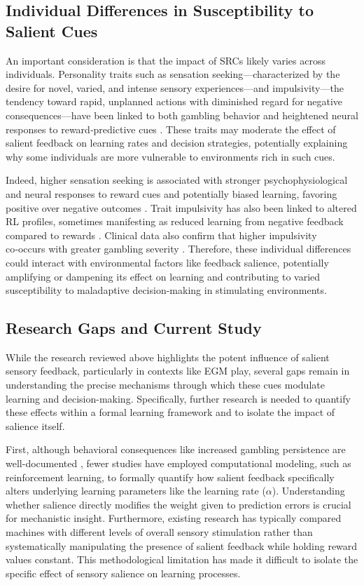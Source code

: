 \subsection{Individual Differences in Susceptibility to Salient Cues}

An important consideration is that the impact of SRCs likely varies across individuals. Personality traits such as sensation seeking—characterized by the desire for novel, varied, and intense sensory experiences—and impulsivity—the tendency toward rapid, unplanned actions with diminished regard for negative consequences—have been linked to both gambling behavior and heightened neural responses to reward‑predictive cues \citep{hawes2017, verdejo2008, zuckerman1994}. These traits may moderate the effect of salient feedback on learning rates and decision strategies, potentially explaining why some individuals are more vulnerable to environments rich in such cues.

Indeed, higher sensation seeking is associated with stronger psychophysiological and neural responses to reward cues \citep{hawes2017} and potentially biased learning, favoring positive over negative outcomes \citep{xu2019}. Trait impulsivity has also been linked to altered RL profiles, sometimes manifesting as reduced learning from negative feedback compared to rewards \citep{pauli2025, zou2022}. Clinical data also confirm that higher impulsivity co‑occurs with greater gambling severity \citep{blaszczynski1997, slutske2005}. Therefore, these individual differences could interact with environmental factors like feedback salience, potentially amplifying or dampening its effect on learning and contributing to varied susceptibility to maladaptive decision-making in stimulating environments.

\subsection{Research Gaps and Current Study}

While the research reviewed above highlights the potent influence of salient sensory feedback, particularly in contexts like EGM play, several gaps remain in understanding the precise mechanisms through which these cues modulate learning and decision-making. Specifically, further research is needed to quantify these effects within a formal learning framework and to isolate the impact of salience itself.

First, although behavioral consequences like increased gambling persistence are well-documented \citep{dixon2014, graydon2019}, fewer studies have employed computational modeling, such as reinforcement learning, to formally quantify how salient feedback specifically alters underlying learning parameters like the learning rate ($\alpha$). Understanding whether salience directly modifies the weight given to prediction errors is crucial for mechanistic insight. Furthermore, existing research has typically compared machines with different levels of overall sensory stimulation rather than systematically manipulating the presence of salient feedback while holding reward values constant. This methodological limitation has made it difficult to isolate the specific effect of sensory salience on learning processes.


